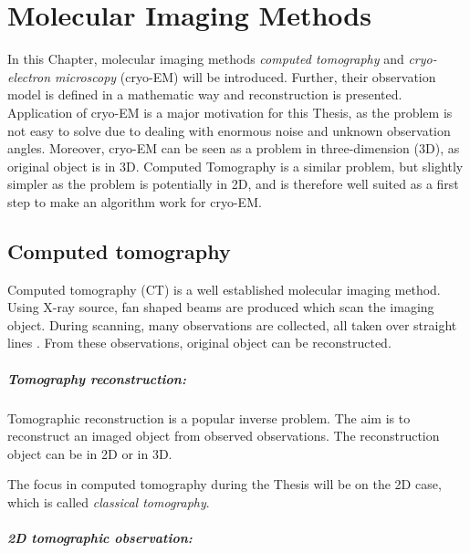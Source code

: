 \chapter{Molecular Imaging Methods}
\label{sec:imaging}

In this Chapter, molecular imaging methods \textit{computed tomography} and 
\textit{cryo-electron microscopy} (cryo-EM) will be introduced. 
Further, their observation model is defined in a mathematic way and reconstruction is presented.
Application of cryo-EM is a major motivation for this Thesis, 
as the problem is not easy to solve due to dealing with enormous noise and unknown observation angles.
Moreover, cryo-EM can be seen as a problem in three-dimension (3D), as original object is in 3D.
Computed Tomography is a similar problem, but slightly simpler as the problem is potentially in 2D, and is therefore well suited as a
first step to make an algorithm work for cryo-EM. 


\section{Computed tomography}
Computed tomography (CT) is a well established molecular imaging method.
Using X-ray source, fan shaped beams are produced which scan the imaging object.
During scanning, many observations are collected, all taken over straight lines \cite{computedTomography}.
From these observations, original object can be reconstructed.

\paragraph{Tomography reconstruction:}
Tomographic reconstruction \cite{tomographicReconstruction} is a popular inverse problem. 
The aim is to reconstruct an imaged object from observed observations.
The reconstruction object can be in 2D or in 3D. 

\begin{tcolorbox}[colback=red!5!white,colframe=red!75!black]
    The focus in computed tomography during the Thesis will be on the 2D case, which is called \textit{classical tomography}.
\end{tcolorbox}

\pagebreak

\paragraph{2D tomographic observation:}


